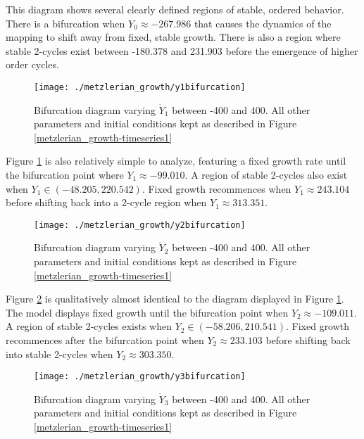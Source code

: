 This diagram shows several clearly defined regions of stable, ordered behavior. There is a bifurcation when $Y_0\approx -267.986$ that causes the dynamics of the mapping to shift away from fixed, stable growth. There is also a region where stable 2-cycles exist between -180.378 and 231.903 before the emergence of higher order cycles. 

\begin{figure}
    \centering
    \texttt{[image: ./metzlerian\_growth/y1bifurcation]}
    \caption{Bifurcation diagram varying $\dot Y_1$ between -400 and 400. All other parameters and initial conditions kept as described in Figure \ref{metzlerian_growth-timeseries1}}
    \label{metzlerian_growth-y1bifurcation}
\end{figure}

Figure \ref{metzlerian_growth-y1bifurcation} is also relatively simple to analyze, featuring a fixed growth rate until the bifurcation point where $Y_1\approx -99.010$. A region of stable 2-cycles also exist when $Y_1\in(-48.205,220.542)$. Fixed growth recommences when $Y_1\approx 243.104$ before shifting back into a 2-cycle region when $Y_1\approx 313.351$. 

\begin{figure}
    \centering
    \texttt{[image: ./metzlerian\_growth/y2bifurcation]}
    \caption{Bifurcation diagram varying $\dot Y_2$ between -400 and 400. All other parameters and initial conditions kept as described in Figure \ref{metzlerian_growth-timeseries1}}
    \label{metzlerian_growth-y2bifurcation}
\end{figure}

Figure \ref{metzlerian_growth-y2bifurcation} is qualitatively almost identical to the diagram displayed in Figure \ref{metzlerian_growth-y1bifurcation}. The model displays fixed growth until the bifurcation point when $Y_2\approx -109.011$. A region of stable 2-cycles exists when $Y_2\in(-58.206, 210.541)$. Fixed growth recommences after the bifurcation point when $Y_2\approx 233.103$ before shifting back into stable 2-cycles when $Y_2\approx 303.350$. 

\begin{figure}
    \centering
    \texttt{[image: ./metzlerian\_growth/y3bifurcation]}
    \caption{Bifurcation diagram varying $\dot Y_3$ between -400 and 400. All other parameters and initial conditions kept as described in Figure \ref{metzlerian_growth-timeseries1}}
    \label{metzlerian_growth-y3bifurcation}
\end{figure}

